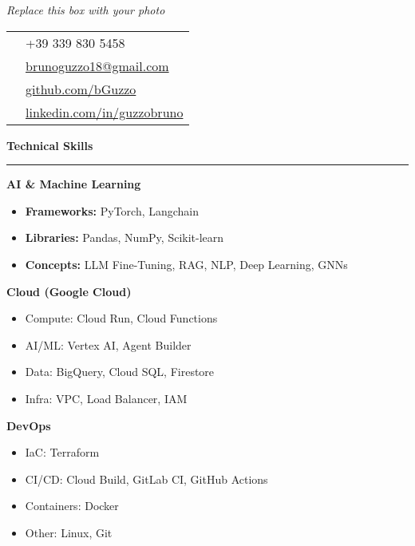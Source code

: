 \documentclass[9pt, a4paper]{article}
\newcommand{\cvsection}[1]{%
	\vspace{2pt}\par
	{\Large\bfseries\color{sectionblue}#1}\par
	\vspace{2pt}\hrule\vspace{6pt}
}
\begin{document}
	\begin{minipage}[t]{0.27\linewidth}
		\vspace{0pt} %
		
		\begin{center}
			\fbox{\rule{0pt}{4.5cm}\hspace{4.5cm}}\par
			\small\textit{Replace this box with your photo}
		\end{center}
		\vspace{8pt}
		
		\begin{tabularx}{\linewidth}{@{}lX@{}}
			\faPhone & +39 339 830 5458 \\
			\faEnvelope & \href{mailto:brunoguzzo18@gmail.com}{brunoguzzo18@gmail.com} \\
			\faGithub & \href{https://github.com/bGuzzo}{github.com/bGuzzo} \\
			\faLinkedin & \href{https://www.linkedin.com/in/guzzobruno/}{linkedin.com/in/guzzobruno} \\
		\end{tabularx}
		
		\cvsection{Technical Skills}
		
		{\bfseries AI \& Machine Learning}
		\begin{itemize}[leftmargin=*, nosep, itemsep=2pt]
			\item \textbf{Frameworks:} PyTorch, Langchain
			\item \textbf{Libraries:} Pandas, NumPy, Scikit-learn
			\item \textbf{Concepts:} LLM Fine-Tuning, RAG, NLP, Deep Learning, GNNs
		\end{itemize}
		
		{\bfseries Cloud (Google Cloud)}
		\begin{itemize}[leftmargin=*, nosep, itemsep=2pt]
			\item Compute: Cloud Run, Cloud Functions
			\item AI/ML: Vertex AI, Agent Builder
			\item Data: BigQuery, Cloud SQL, Firestore
			\item Infra: VPC, Load Balancer, IAM
		\end{itemize}
		
		{\bfseries DevOps}
		\begin{itemize}[leftmargin=*, nosep, itemsep=2pt]
			\item IaC: Terraform
			\item CI/CD: Cloud Build, GitLab CI, GitHub Actions
			\item Containers: Docker
			\item Other: Linux, Git
		\end{itemize}
		

\end{minipage}
\end{document}

